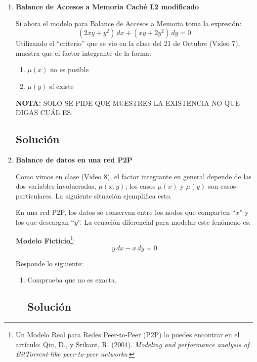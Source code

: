 \begin{enumerate}[label=\arabic*., leftmargin=*]
    \item \textbf{Balance de Accesos a Memoria Caché L2 modificado}

    Si ahora el modelo para Balance de Accesos a Memoria toma la expresión:
    \[ (2xy + y^{2})\,dx + (xy + 2y^{2})\,dy = 0 \]
    Utilizando el ``criterio'' que se vio en la clase del 21 de Octubre (Video 7), muestra que el factor integrante de la forma:
    \begin{enumerate}[label=\roman*., leftmargin=*]
        \item $\mu(x)$ no es posible
        \item $\mu(y)$ sí existe
    \end{enumerate}
    \textbf{NOTA:} SOLO SE PIDE QUE MUESTRES LA EXISTENCIA NO QUE DIGAS CUÁL ES.
    \subsection*{Solución}

    \item \textbf{Balance de datos en una red P2P}

    Como vimos en clase (Video 8), el factor integrante en general depende de las dos variables involucradas, $\mu(x,y)$; los casos $\mu(x)$ y $\mu(y)$ son casos particulares. La siguiente situación ejemplifica esto.

    En una red P2P, los datos se conservan entre los nodos que comparten ``$x$'' y los que descargan ``$y$''. La ecuación diferencial para modelar este fenómeno es:

    \textbf{Modelo Ficticio}\footnote{Un Modelo Real para Redes Peer-to-Peer (P2P) lo puedes encontrar en el artículo: Qiu, D., y Srikant, R. (2004). \textit{Modeling and performance analysis of BitTorrent-like peer-to-peer networks}.}:
    \begin{equation*}
        y\,dx - x\,dy = 0 \tag{1}
    \end{equation*}

    Responde lo siguiente:
    \begin{enumerate}[label=(\alph*), leftmargin=*]
        \item Comprueba que no es exacta.
        \subsection*{Solución}


\end{enumerate}
\end{enumerate}
